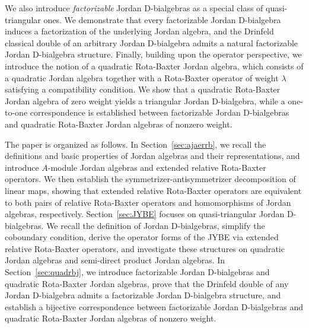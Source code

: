 \documentclass[12pt, reqno, a4paper]{amsart}
\theoremstyle{definition}
\begin{document}
We also introduce \emph{factorizable} Jordan D-bialgebras as a special class of quasi-triangular ones.
We demonstrate that every factorizable Jordan D-bialgebra induces a factorization of the underlying Jordan algebra, and the Drinfeld classical double of an arbitrary Jordan D-bialgebra admits a natural factorizable Jordan D-bialgebra structure. Finally, building upon the operator perspective, we introduce the notion of a quadratic Rota-Baxter Jordan algebra, which consists of a quadratic Jordan algebra together with a Rota-Baxter operator of weight $\lambda$ satisfying a compatibility condition.
We show that a quadratic Rota-Baxter Jordan algebra of zero weight yields a triangular Jordan D-bialgebra, while a one-to-one correspondence is established between factorizable Jordan D-bialgebras and quadratic Rota-Baxter Jordan algebras of nonzero weight.


The paper is organized as follows.
In Section~\ref{sec:ajaerrb}, we recall the definitions and basic properties of Jordan algebras and their representations, and introduce $A$-module Jordan algebras and extended relative Rota-Baxter operators.
We then establish the symmetrizer-antisymmetrizer decomposition of linear maps, showing that extended relative Rota-Baxter operators are equivalent to both pairs of relative Rota-Baxter operators and homomorphisms of Jordan algebras, respectively.
Section~\ref{sec:JYBE} focuses on quasi-triangular Jordan D-bialgebras. We recall the definition of Jordan D-bialgebras, simplify the coboundary condition, derive the operator forms of the JYBE via extended relative Rota-Baxter operators, and investigate these structures on quadratic Jordan algebras and semi-direct product Jordan algebras.
In Section~\ref{sec:quadrbj}, we introduce factorizable Jordan D-bialgebras and quadratic Rota-Baxter Jordan algebras, prove that the Drinfeld double of any Jordan D-bialgebra admits a factorizable Jordan D-bialgebra structure, and establish a bijective correspondence between factorizable Jordan D-bialgebras and quadratic Rota-Baxter Jordan algebras of nonzero weight.
\end{document}
